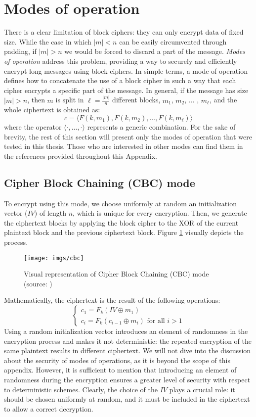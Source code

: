 \documentclass[target=mst,aauheader=aics]{thud}
\theoremstyle{definition}
\begin{document}
\section{Modes of operation}\label{sec:modes}
There is a clear limitation of block ciphers: they can only encrypt data of fixed size. While the case in which $|m| < n$ can be easily circumvented through padding, if $|m| > n$ we would be forced to discard a part of the message. \textit{Modes of operation} address this problem, providing a way to securely and efficiently encrypt long messages using block ciphers. In simple terms, a mode of operation defines how to concatenate the use of a block cipher in such a way that each cipher encrypts a specific part of the message. In general, if the message has size $|m| > n$, then $m$ is split in $\ell = \frac{|m|}{n}$ different blocks, $m_1$, $m_2$, ... , $m_{\ell}$, and the whole ciphertext is obtained as:
\[
c = \langle F(k, m_1), F(k, m_2), ..., F(k, m_{\ell})\rangle
\]
where the operator $\langle \cdot , ..., \cdot \rangle$ represents a generic combination. For the sake of brevity, the rest of this section will present only the modes of operation that were tested in this thesis. Those who are interested in other modes can find them in the references provided throughout this Appendix.

\subsection{Cipher Block Chaining (CBC) mode}
To encrypt using this mode, we choose uniformly at random an initialization vector ($IV$) of length $n$, which is unique for every encryption. Then, we generate the ciphertext blocks by applying the block cipher to the XOR of the current plaintext block and the previous ciphertext block. Figure \ref{fig:cbc} visually depicts the process.
\begin{figure}[!h]
	\centering
	\texttt{[image: imgs/cbc]}
	\captionsetup{width=.7\linewidth}
	\caption{Visual representation of Cipher Block Chaining (CBC) mode (source: \cite{Katz2007})}
	\label{fig:cbc}
\end{figure}
Mathematically, the ciphertext is the result of the following operations:
\[
\begin{cases}
	c_1 = F_k(IV \oplus m_1)\\
	c_i = F_k(c_{i-1}\oplus m_i) \text{ for all } i>1
\end{cases}
\]
Using a random initialization vector introduces an element of randomness in the encryption process and makes it not deterministic: the repeated encryption of the same plaintext results in different ciphertext. 
We will not dive into the discussion about the security of modes of operations, as it is beyond the scope of this appendix. However, it is sufficient to mention that introducing an element of randomness during the encryption ensures a greater level of security with respect to deterministic schemes. Clearly, the choice of the $IV$ plays a crucial role: it should be chosen uniformly at random, and it must be included in the ciphertext to allow a correct decryption.
\end{document}
